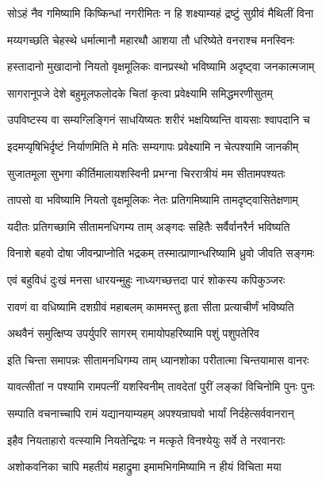 \twolineshloka
{सोऽहं नैव गमिष्यामि किष्किन्धां नगरीमितः}
{न हि शक्ष्याम्यहं द्रष्टुं सुग्रीवं मैथिलीं विना} %

\twolineshloka
{मय्यगच्छति चेहस्थे धर्मात्मानौ महारथौ}
{आशया तौ धरिष्येते वनराश्च मनस्विनः} %

\twolineshloka
{हस्तादानो मुखादानो नियतो वृक्षमूलिकः}
{वानप्रस्थो भविष्यामि अदृष्ट्वा जनकात्मजाम्} %

\twolineshloka
{सागरानूपजे देशे बहुमूलफलोदके}
{चितां कृत्वा प्रवेक्ष्यामि समिद्धमरणीसुतम्} %

\twolineshloka
{उपविष्टस्य वा सम्यग्लिङ्गिनं साधयिष्यतः}
{शरीरं भक्षयिष्यन्ति वायसाः श्वापदानि च} %

\twolineshloka
{इदमप्यृषिभिर्दृष्टं निर्याणमिति मे मतिः}
{सम्यगापः प्रवेक्ष्यामि न चेत्पश्यामि जानकीम्} %

\twolineshloka
{सुजातमूला सुभगा कीर्तिमालायशस्विनी}
{प्रभग्ना चिररात्रीयं मम सीतामपश्यतः} %

\twolineshloka
{तापसो वा भविष्यामि नियतो वृक्षमूलिकः}
{नेतः प्रतिगमिष्यामि तामदृष्ट्वासितेक्षणाम्} %

\twolineshloka
{यदीतः प्रतिगच्छामि सीतामनधिगम्य ताम्}
{अङ्गदः सहितैः सर्वैर्वानरैर्न भविष्यति} %

\twolineshloka
{विनाशे बहवो दोषा जीवन्प्राप्नोति भद्रकम्}
{तस्मात्प्राणान्धरिष्यामि ध्रुवो जीवति सङ्गमः} %

\twolineshloka
{एवं बहुविधं दुःखं मनसा धारयन्मुहुः}
{नाध्यगच्छत्तदा पारं शोकस्य कपिकुञ्जरः} %

\twolineshloka
{रावणं वा वधिष्यामि दशग्रीवं महाबलम्}
{काममस्तु हृता सीता प्रत्याचीर्णं भविष्यति} %

\twolineshloka
{अथवैनं समुत्क्षिप्य उपर्युपरि सागरम्}
{रामायोपहरिष्यामि पशुं पशुपतेरिव} %

\twolineshloka
{इति चिन्ता समापन्नः सीतामनधिगम्य ताम्}
{ध्यानशोका परीतात्मा चिन्तयामास वानरः} %

\twolineshloka
{यावत्सीतां न पश्यामि रामपत्नीं यशस्विनीम्}
{तावदेतां पुरीं लङ्कां विचिनोमि पुनः पुनः} %

\twolineshloka
{सम्पाति वचनाच्चापि रामं यद्यानयाम्यहम्}
{अपश्यन्राघवो भार्यां निर्दहेत्सर्ववानरान्} %

\twolineshloka
{इहैव नियताहारो वत्स्यामि नियतेन्द्रियः}
{न मत्कृते विनश्येयुः सर्वे ते नरवानराः} %

\twolineshloka
{अशोकवनिका चापि महतीयं महाद्रुमा}
{इमामभिगमिष्यामि न हीयं विचिता मया} %

